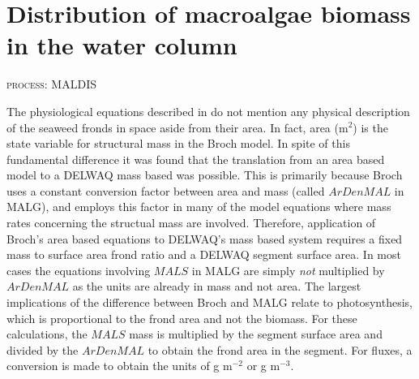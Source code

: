 \documentclass{deltares_manual}
\begin{document}
\section{Distribution of macroalgae biomass in the water column}
\begin{flushright}
	\textsc{process: MALDIS}
\end{flushright}
The physiological equations described in \cite{broch2012} do not mention any physical description of the seaweed fronds in space aside from their area. In fact, area (m$^{2}$) is the state variable for structural mass in the Broch model. In spite of this fundamental difference it was found that the translation from an area based model to a DELWAQ mass based was possible. This is primarily because Broch uses a constant conversion factor between area and mass (called $ArDenMAL$ in MALG), and employs this factor in many of the model equations where mass rates concerning the structual mass are involved. Therefore, application of Broch's area based equations to DELWAQ's mass based system requires a fixed mass to surface area frond ratio and a DELWAQ segment surface area. In most cases the equations involving $MALS$ in MALG are simply \textit{not} multiplied by $ArDenMAL$ as the units are already in mass and not area. The largest implications of the difference between Broch and MALG relate to photosynthesis, which is proportional to the frond area and not the biomass. For these calculations, the $MALS$ mass is multiplied by the segment surface area and divided by the $ArDenMAL$ to obtain the frond area in the segment. For fluxes, a conversion is made to obtain the units of g m$^{-2}$ or g m$^{-3}$.  
\end{document}
